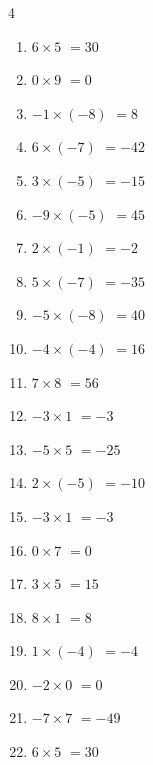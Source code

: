 \begin{multicols}{4}
\begin{enumerate}
  \item $6\times 5$
        $=30$

  \item $0\times 9$
        $=0$

  \item $-1\times (-8)$
        $=8$

  \item $6\times (-7)$
        $=-42$

\columnbreak %

  \item $3\times (-5)$
        $=-15$

  \item $-9\times (-5)$
        $=45$

  \item $2\times (-1)$
        $=-2$

  \item $5\times (-7)$
        $=-35$

  \item $-5\times (-8)$
        $=40$

  \item $-4\times (-4)$
        $=16$

  \item $7\times 8$
        $=56$

  \item $-3\times 1$
        $=-3$

  \item $-5\times 5$
        $=-25$

  \item $2\times (-5)$
        $=-10$

  \item $-3\times 1$
        $=-3$

  \item $0\times 7$
        $=0$

  \item $3\times 5$
        $=15$

  \item $8\times 1$
        $=8$

  \item $1\times (-4)$
        $=-4$

  \item $-2\times 0$
        $=0$

  \item $-7\times 7$
        $=-49$

  \item $6\times 5$
        $=30$


\end{enumerate}
\end{multicols}
